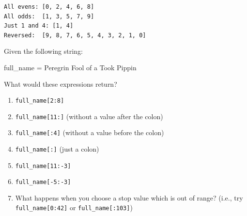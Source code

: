 \documentclass[
  letterpaper,
  DIV=11,
  numbers=noendperiod]{scrreprt}
\newenvironment{Shaded}{\begin{snugshade}}{\end{snugshade}}
\newcommand{\NormalTok}[1]{\textcolor[rgb]{0.00,0.23,0.31}{#1}}
\newcommand{\OperatorTok}[1]{\textcolor[rgb]{0.37,0.37,0.37}{#1}}
\newcommand{\StringTok}[1]{\textcolor[rgb]{0.13,0.47,0.30}{#1}}
\providecommand{\tightlist}{%
  \setlength{\itemsep}{0pt}\setlength{\parskip}{0pt}}\usepackage{longtable,booktabs,array}
\begin{document}
\begin{verbatim}
All evens: [0, 2, 4, 6, 8]
All odds:  [1, 3, 5, 7, 9]
Just 1 and 4: [1, 4]
Reversed:  [9, 8, 7, 6, 5, 4, 3, 2, 1, 0]
\end{verbatim}

\begin{tcolorbox}[enhanced jigsaw, rightrule=.15mm, opacitybacktitle=0.6, colback=white, toprule=.15mm, colframe=quarto-callout-warning-color-frame, bottomtitle=1mm, bottomrule=.15mm, arc=.35mm, coltitle=black, breakable, title={Challenge 3}, titlerule=0mm, opacityback=0, colbacktitle=quarto-callout-warning-color!10!white, left=2mm, toptitle=1mm, leftrule=.75mm]

Given the following string:

\begin{Shaded}
\begin{Highlighting}[]
\NormalTok{full\_name }\OperatorTok{=} \StringTok{\textquotesingle{}Peregrin Fool of a Took Pippin\textquotesingle{}}
\end{Highlighting}
\end{Shaded}

What would these expressions return?

\begin{enumerate}
\def\labelenumi{\arabic{enumi}.}
\tightlist
\item
  \texttt{full\_name{[}2:8{]}}
\item
  \texttt{full\_name{[}11:{]}} (without a value after the colon)
\item
  \texttt{full\_name{[}:4{]}} (without a value before the colon)
\item
  \texttt{full\_name{[}:{]}} (just a colon)
\item
  \texttt{full\_name{[}11:-3{]}}
\item
  \texttt{full\_name{[}-5:-3{]}}
\item
  What happens when you choose a stop value which is out of range?
  (i.e., try \texttt{full\_name{[}0:42{]}} or
  \texttt{full\_name{[}:103{]}})
\end{enumerate}

\end{tcolorbox}
\end{document}
